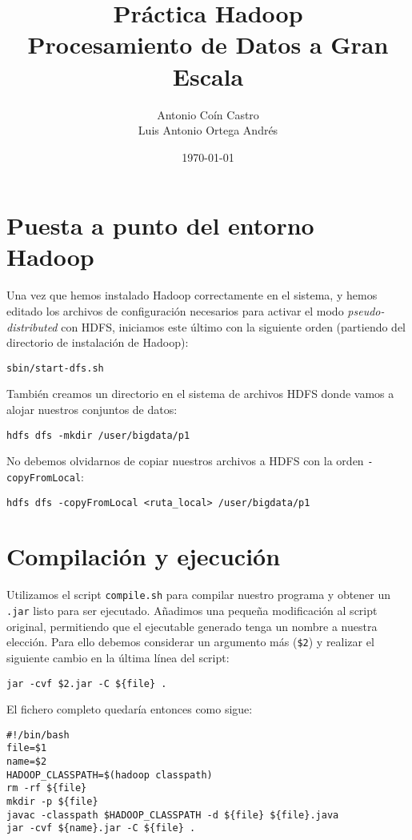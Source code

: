 \documentclass[11pt]{article}
\author{Antonio Coín Castro\\ Luis Antonio Ortega Andrés}
\date{\today}
\title{Práctica Hadoop\\\medskip
\large Procesamiento de Datos a Gran Escala}
\begin{document}
\maketitle

\section*{Puesta a punto del entorno Hadoop}

Una vez que hemos instalado Hadoop correctamente en el sistema, y hemos editado los archivos de configuración necesarios para activar el modo \textit{pseudo-distributed} con HDFS, iniciamos este último con la siguiente orden (partiendo del directorio de instalación de Hadoop):

\begin{verbatim}
sbin/start-dfs.sh
\end{verbatim}

También creamos un directorio en el sistema de archivos HDFS donde vamos a alojar nuestros conjuntos de datos:

\begin{verbatim}
hdfs dfs -mkdir /user/bigdata/p1
\end{verbatim}

No debemos olvidarnos de copiar nuestros archivos a HDFS con la orden \verb|-copyFromLocal|:

\begin{verbatim}
hdfs dfs -copyFromLocal <ruta_local> /user/bigdata/p1
\end{verbatim}

\section*{Compilación y ejecución}

Utilizamos el script \verb|compile.sh| para compilar nuestro programa y obtener un \verb|.jar| listo para ser ejecutado. Añadimos una pequeña modificación al script original, permitiendo que el ejecutable generado tenga un nombre a nuestra elección. Para ello debemos considerar un argumento más (\texttt{\$2}) y realizar el siguiente cambio en la última línea del script:

\begin{verbatim}
jar -cvf $2.jar -C ${file} .
\end{verbatim}

El fichero completo quedaría entonces como sigue:

\begin{verbatim}
#!/bin/bash
file=$1
name=$2
HADOOP_CLASSPATH=$(hadoop classpath)
rm -rf ${file}
mkdir -p ${file}
javac -classpath $HADOOP_CLASSPATH -d ${file} ${file}.java
jar -cvf ${name}.jar -C ${file} .
\end{verbatim}
\end{document}
